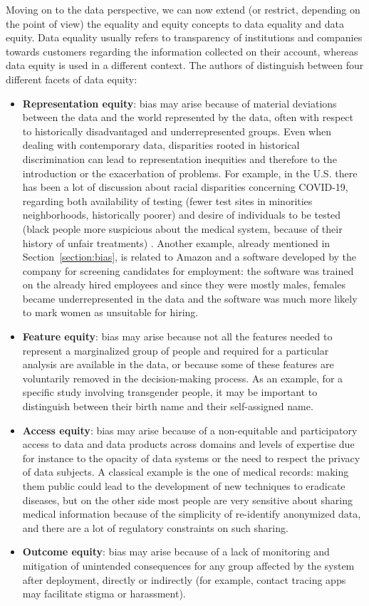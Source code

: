 Moving on to the data perspective, we can now extend (or restrict, depending on the point of view) the equality and equity concepts to data equality and data equity. Data equality usually refers to transparency of institutions and companies towards customers regarding the information collected on their account, whereas data equity is used in a different context. The authors of \cite{jagadish2021facets} distinguish between four different facets of data equity:
\begin{itemize}
\item \textbf{Representation equity}: bias may arise because of material deviations between the data and the world represented by the data, often with respect to historically disadvantaged and underrepresented groups. Even when dealing with contemporary data, disparities rooted in historical discrimination can lead to representation inequities and therefore to the introduction or the exacerbation of problems. For example, in the U.S. there has been a lot of discussion about racial disparities concerning COVID-19, regarding both availability of testing (fewer test sites in minorities neighborhoods, historically poorer) and desire of individuals to be tested (black people more suspicious about the medical system, because of their history of unfair treatments) \cite{jagadish2021facets}. Another example, already mentioned in Section~\ref{section:bias}, is related to Amazon and a software developed by the company for screening candidates for employment: the software was trained on the already hired employees and since they were mostly males, females became underrepresented in the data and the software was much more likely to mark women as unsuitable for hiring.
\item \textbf{Feature equity}: bias may arise because not all the features needed to represent a marginalized group of people and required for a particular analysis are available in the data, or because some of these features are voluntarily removed in the decision-making process. As an example, for a specific study involving transgender people, it may be important to distinguish between their birth name and their self-assigned name.
\item \textbf{Access equity}: bias may arise because of a non-equitable and participatory access to data and data products across domains and levels of expertise due for instance to the opacity of data systems or the need to respect the privacy of data subjects. A classical example is the one of medical records: making them public could lead to the development of new techniques to eradicate diseases, but on the other side most people are very sensitive about sharing medical information because of the simplicity of re-identify anonymized data, and there are a lot of regulatory constraints on such sharing.
\item \textbf{Outcome equity}: bias may arise because of a lack of monitoring and mitigation of unintended consequences for any group affected by the system after deployment, directly or indirectly (for example, contact tracing apps may facilitate stigma or harassment).
\end{itemize}


